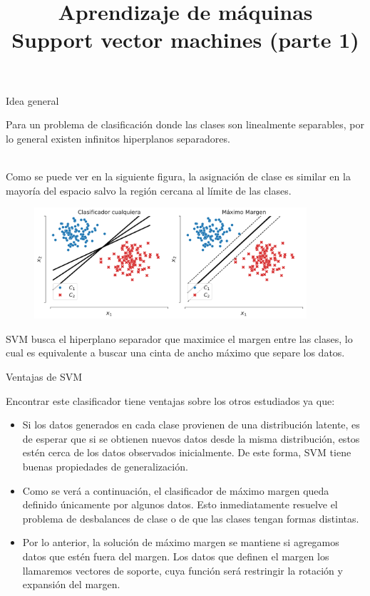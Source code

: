 \documentclass[9pt]{beamer}
\title{\textbf{Aprendizaje de máquinas} \\ Support vector machines (parte 1)}
\begin{document}
\begin{frame}
  \titlepage
\end{frame}

\begin{frame}{Idea general}

Para un problema de clasificación donde las clases son linealmente separables, por lo general existen infinitos hiperplanos separadores.\\~\ \pause

Como se puede ver en la siguiente figura, la asignación de clase es similar en la mayoría del espacio salvo la región cercana al límite de las clases.

\begin{figure}[ht]
    \centering
    \includegraphics[width=0.9\textwidth]{../img/cap5_max_margen.pdf}
\end{figure}\pause

SVM busca el hiperplano separador que maximice el margen entre las clases, lo cual es equivalente a buscar una cinta de ancho máximo que separe los datos.
	
\end{frame}


\begin{frame}{Ventajas de SVM}

Encontrar este clasificador tiene ventajas sobre los otros estudiados ya que:

\begin{itemize}
	\item Si los datos generados en cada clase provienen de una distribución latente, es de esperar que si se obtienen nuevos datos desde la misma distribución, estos estén cerca de los datos observados inicialmente. De este forma, SVM tiene buenas propiedades de generalización.\pause
	\item Como se verá a continuación, el clasificador de máximo margen queda definido únicamente por algunos datos. Esto inmediatamente resuelve el problema de desbalances de clase o de que las clases tengan formas distintas.\pause
	\item Por lo anterior, la solución de máximo margen se mantiene si agregamos datos que estén fuera del margen. Los datos que definen el margen los llamaremos vectores de soporte, cuya función será restringir la rotación y expansión del margen.
\end{itemize}
	
\end{frame}
\end{document}

